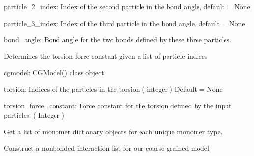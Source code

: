 \documentclass[letterpaper,12pt,english,openany,oneside]{sphinxmanual}
\begin{document}
\begin{fulllineitems}
\begin{fulllineitems}
particle\_2\_index: Index of the second particle in the bond angle, default = None

particle\_3\_index: Index of the third particle in the bond angle, default = None

bond\_angle: Bond angle for the two bonds defined by these three particles.

\end{fulllineitems}


\begin{fulllineitems}
\label{\detokenize{cg_model:cg_model.cgmodel.CGModel.get_equil_torsion_angle}}
Determines the torsion force constant given a list of particle indices

cgmodel: CGModel() class object

torsion: Indices of the particles in the torsion
( integer )
Default = None

torsion\_force\_constant: Force constant for the torsion defined by the input particles.
( Integer )

\end{fulllineitems}


\begin{fulllineitems}
\label{\detokenize{cg_model:cg_model.cgmodel.CGModel.get_monomer_types}}
Get a list of monomer dictionary objects for each unique monomer type.

\end{fulllineitems}


\begin{fulllineitems}
\label{\detokenize{cg_model:cg_model.cgmodel.CGModel.get_nonbonded_interaction_list}}
Construct a nonbonded interaction list for our coarse grained model


\end{fulllineitems}
\end{fulllineitems}
\end{document}
